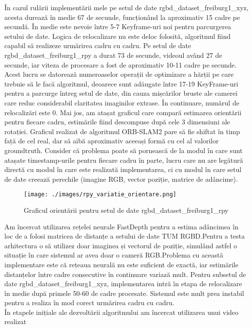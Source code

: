 \documentclass[12pt,a4paper]{report}
\begin{document}
În cazul rulării implementării mele pe setul de date rgbd\_dataset\_freiburg1\_xyz, acesta 
durează în medie 67 de secunde, funcționând la aproximativ 15 cadre pe secundă. În medie 
este nevoie între 5{-}7 Keyframe-uri noi pentru parcurgerea setului de date. Logica 
de relocalizare nu este deloc folosită, algoritmul fiind capabil să realizeze urmărirea
cadru cu cadru.
Pe setul de date rgbd\_dataset\_freiburg1\_rpy a durat 73 de secunde, videoul având 
27 de secunde, iar viteza de procesare a fost de aproximativ 10{-}11 cadre pe secunde. 
Acest lucru se datorează numeroaselor operații de optimizare a hărții pe care trebuie să
le facă algoritmul, deoarece sunt adăugate între 17{-}19 KeyFrame-uri pentru a parcurge întreg
setul de date, din cauza mișcărilor bruste ale camerei care reduc considerabil claritatea 
imaginilor extrase. În continuare, numărul de relocalizări este 0. Mai jos, am atașat graficul
care compară estimarea orientării pentru fiecare cadru, estimările fiind descompuse după cele
3 dimensiuni ale rotației. Graficul realizat de algoritmul ORB-SLAM2 pare să fie shiftat în timp
față de cel real, dar să aibă aproximativ aceeași formă cu cel al valorilor groundtruth.
Consider că problema poate să pornească de la modul în care sunt atașate timestamp-urile 
pentru fiecare cadru în parte, lucru care nu are legătură directă cu modul în care este
realizată implementarea, ci cu modul în care setul de date creează perechile (imagine RGB, 
vector poziție, matrice de adâncime).      
\begin{figure}[htbp]  
  \centering
  \texttt{[image: ./images/rpy\_variatie\_orientare.png]}
  \caption{Graficul orientării pentru setul de date rgbd\_dataset\_freiburg1\_rpy}\label{fig:orientare}
\end{figure}
Am încercat utilizarea rețelei neurale FastDepth pentru a estima adâncimea în loc de a
folosi matricea de distanțe a setului de date TUM RGBD.\@ Pentru a testa arhitectura o să utilizez
 doar imaginea și vectorul de poziție, simulând astfel o situație în care sistemul ar avea
doar o cameră RGB.\@ Problema cu această implementare este că rețeaua neurală nu este suficient
de exactă, iar estimările distanțelor între cadre consecutive în continuare variază mult. Pentru 
subsetul de date rgbd\_dataset\_freiburg1\_xyz, implementarea intră în etapa de relocalizare
în medie după primele 50{-}60 de cadre procesate. Sistemul este mult prea instabil pentru
a realiza în mod corect urmărirea cadru cu cadru. \\
În etapele inițiale ale dezvoltării algoritmului am încercat utilizarea unui video realizat 
\end{document}

